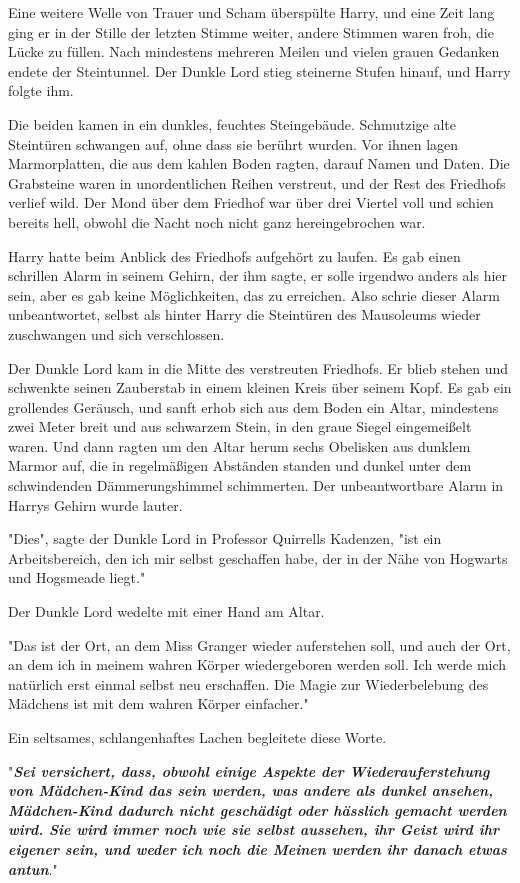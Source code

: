 {Eine weitere Welle von Trauer und Scham überspülte Harry, und eine Zeit lang ging er in der Stille der letzten Stimme weiter, andere Stimmen waren froh, die Lücke zu füllen. Nach mindestens mehreren Meilen und vielen grauen Gedanken endete der Steintunnel. Der Dunkle Lord stieg steinerne Stufen hinauf, und Harry folgte ihm.

Die beiden kamen in ein dunkles, feuchtes Steingebäude. Schmutzige alte Steintüren schwangen auf, ohne dass sie berührt wurden. Vor ihnen lagen Marmorplatten, die aus dem kahlen Boden ragten, darauf Namen und Daten. Die Grabsteine waren in unordentlichen Reihen verstreut, und der Rest des Friedhofs verlief wild. Der Mond über dem Friedhof war über drei Viertel voll und schien bereits hell, obwohl die Nacht noch nicht ganz hereingebrochen war.

Harry hatte beim Anblick des Friedhofs aufgehört zu laufen. Es gab einen schrillen Alarm in seinem Gehirn, der ihm sagte, er solle irgendwo anders als hier sein, aber es gab keine Möglichkeiten, das zu erreichen. Also schrie dieser Alarm unbeantwortet, selbst als hinter Harry die Steintüren des Mausoleums wieder zuschwangen und sich verschlossen.

Der Dunkle Lord kam in die Mitte des verstreuten Friedhofs. Er blieb stehen und schwenkte seinen Zauberstab in einem kleinen Kreis über seinem Kopf. Es gab ein grollendes Geräusch, und sanft erhob sich aus dem Boden ein Altar, mindestens zwei Meter breit und aus schwarzem Stein, in den graue Siegel eingemeißelt waren. Und dann ragten um den Altar herum sechs Obelisken aus dunklem Marmor auf, die in regelmäßigen Abständen standen und dunkel unter dem schwindenden Dämmerungshimmel schimmerten. Der unbeantwortbare Alarm in Harrys Gehirn wurde lauter.

"Dies", sagte der Dunkle Lord in Professor Quirrells Kadenzen, "ist ein Arbeitsbereich, den ich mir selbst geschaffen habe, der in der Nähe von Hogwarts und Hogsmeade liegt."

Der Dunkle Lord wedelte mit einer Hand am Altar.

"Das ist der Ort, an dem Miss Granger wieder auferstehen soll, und auch der Ort, an dem ich in meinem wahren Körper wiedergeboren werden soll. Ich werde mich natürlich erst einmal selbst neu erschaffen. Die Magie zur Wiederbelebung des Mädchens ist mit dem wahren Körper einfacher."

Ein seltsames, schlangenhaftes Lachen begleitete diese Worte.

"\textbf{\emph{Sei versichert, dass, obwohl einige Aspekte der Wiederauferstehung von Mädchen-Kind das sein werden, was andere als dunkel ansehen, Mädchen-Kind dadurch nicht geschädigt oder hässlich gemacht werden wird. Sie wird immer noch wie sie selbst aussehen, ihr Geist wird ihr eigener sein, und weder ich noch die Meinen werden ihr danach etwas antun}}."

}
